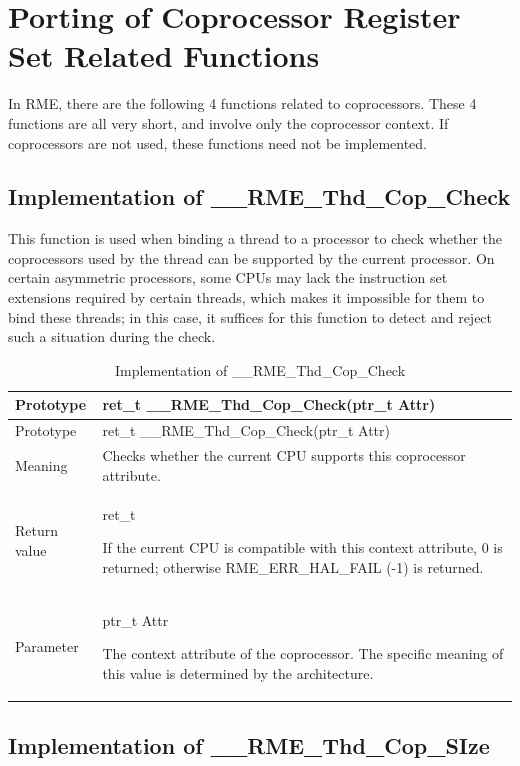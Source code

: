\section{Porting of Coprocessor Register Set Related Functions}\label{sec:7-coprocessor-register-set-function-porting}

In RME, there are the following 4 functions related to coprocessors. These 4 functions are all very short, and involve only the coprocessor context. If coprocessors are not used, these functions need not be implemented.

\subsection{Implementation of \_\_RME\_Thd\_Cop\_Check}\label{subsec:7-rme-thd-cop-check-implementation}

This function is used when binding a thread to a processor to check whether the coprocessors used by the thread can be supported by the current processor. On certain asymmetric processors, some CPUs may lack the instruction set extensions required by certain threads, which makes it impossible for them to bind these threads; in this case, it suffices for this function to detect and reject such a situation during the check.

\begin{xltabular}{\textwidth}{@{}>{\hsize\raggedright\arraybackslash}X>{\hsize\raggedright\arraybackslash}X@{}}
\caption{Implementation of \_\_RME\_Thd\_Cop\_Check}\label{tab:7-69-rme-thd-cop-check-implementation}\\
\toprule
Prototype & ret\_t \_\_RME\_Thd\_Cop\_Check(ptr\_t Attr)\tabularnewline
\endfirsthead
\toprule
Prototype & ret\_t \_\_RME\_Thd\_Cop\_Check(ptr\_t Attr)\tabularnewline
\midrule
\endhead
\bottomrule
\endlastfoot
Meaning & Checks whether the current CPU supports this coprocessor attribute.\tabularnewline
Return value\strut
 & ret\_t

If the current CPU is compatible with this context attribute, 0 is returned; otherwise RME\_ERR\_HAL\_FAIL (-1) is returned.\strut
\tabularnewline
Parameter\strut
 & ptr\_t Attr

The context attribute of the coprocessor. The specific meaning of this value is determined by the architecture.\strut
\tabularnewline
\end{xltabular}
\nopagebreak[4]

\subsection{Implementation of \_\_RME\_Thd\_Cop\_SIze}\label{subsec:7-rme-thd-cop-size-implementation}

